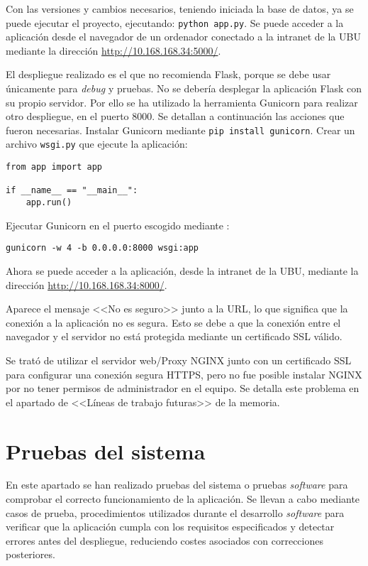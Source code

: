 Con las versiones y cambios necesarios, teniendo iniciada la base de datos, ya se puede ejecutar el proyecto, ejecutando:
\texttt{python app.py}. Se puede acceder a la aplicación desde el navegador de un ordenador conectado a la intranet de la UBU mediante la dirección \url{http://10.168.168.34:5000/}.



El despliegue realizado es el que no recomienda Flask, porque se debe usar únicamente para \textit{debug} y pruebas. No se debería desplegar la aplicación Flask con su propio servidor.
Por ello se ha utilizado la herramienta Gunicorn para realizar otro despliegue, en el puerto 8000. Se detallan a continuación las acciones que fueron necesarias.
Instalar Gunicorn mediante \texttt{pip install gunicorn}.
Crear un archivo \texttt{wsgi.py} que ejecute la aplicación:
\begin{verbatim}
from app import app

if __name__ == "__main__":
    app.run()
\end{verbatim}
Ejecutar Gunicorn en el puerto escogido mediante :
\begin{verbatim}gunicorn -w 4 -b 0.0.0.0:8000 wsgi:app\end{verbatim}

Ahora se puede acceder a la aplicación, desde la intranet de la UBU, mediante la dirección \url{http://10.168.168.34:8000/}.

Aparece el mensaje <<No es seguro>> junto a la URL, lo que significa que la conexión a la aplicación no es segura. Esto se debe a que la conexión entre el navegador y el servidor no está protegida mediante un certificado SSL válido.

Se trató de utilizar el servidor web/Proxy NGINX junto con un certificado SSL para configurar una conexión segura HTTPS, pero no fue posible instalar NGINX por no tener permisos de administrador en el equipo. 
Se detalla este problema en el apartado de <<Líneas de trabajo futuras>> de la memoria.




\section{Pruebas del sistema}
En este apartado se han realizado pruebas del sistema o pruebas \textit{software} para comprobar el correcto funcionamiento de la aplicación. Se llevan a cabo mediante casos de prueba, procedimientos utilizados durante el desarrollo \textit{software} para verificar que la aplicación cumpla con los requisitos especificados y detectar errores antes del despliegue, reduciendo costes asociados con correcciones posteriores.

